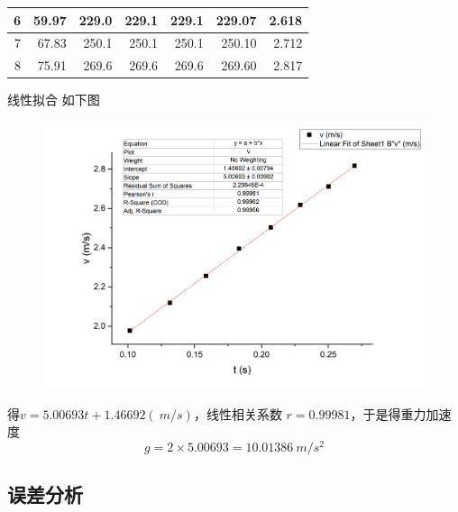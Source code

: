 \documentclass[12pt]{article}
\begin{document}
\begin{table}[htbp]
\begin{tabular}{|r|r|r|r|r|r|r|}
        \hline
        6                                             & 59.97                     & 229.0                                         & 229.1                               & 229.1                    & 229.07                  & 2.618 \bigstrut                       \\
        \hline
        7                                             & 67.83                     & 250.1                                         & 250.1                               & 250.1                    & 250.10                  & 2.712 \bigstrut                       \\
        \hline
        8                                             & 75.91                     & 269.6                                         & 269.6                               & 269.6                    & 269.60                  & 2.817 \bigstrut                       \\
        \hline
    \end{tabular}%
\end{table}%

线性拟合
如下图
\begin{figure}[htbp]
    \includegraphics[scale=0.5]{graph.png}
\end{figure}

得\(v=5.00693t+1.46692(\SI{}{m/s})\)，线性相关系数 \(r=0.99981\)，于是得重力加速度
\[g=2\times 5.00693=\SI{10.01386}{m/s^2}\]



\subsection*{误差分析}
\end{document}
